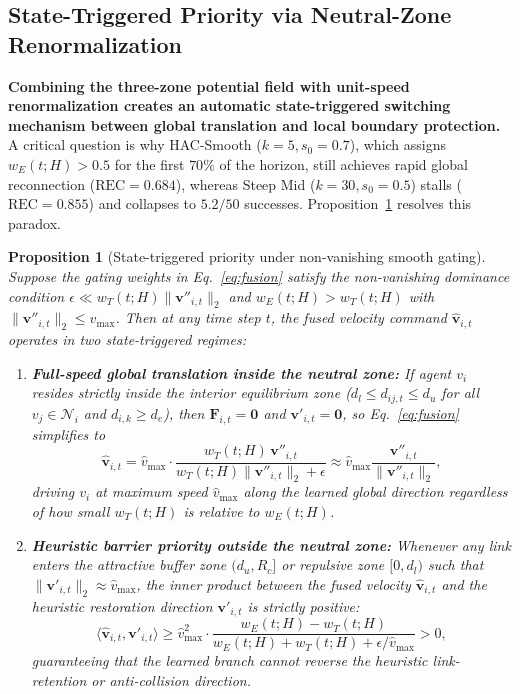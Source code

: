 \documentclass[11pt]{article}
\theoremstyle{plain}
\newtheorem{proposition}{Proposition}
\theoremstyle{definition}
\theoremstyle{remark}
\begin{document}
\subsection{State-Triggered Priority via Neutral-Zone Renormalization}
\label{sec:neutral-zone}

\textbf{Combining the three-zone potential field with unit-speed renormalization creates an automatic state-triggered switching mechanism between global translation and local boundary protection.} A critical question is why HAC-Smooth ($k=5, s_0=0.7$), which assigns $w_E(t; H) > 0.5$ for the first $70\%$ of the horizon, still achieves rapid global reconnection ($\mathrm{REC} = 0.684$), whereas Steep Mid ($k=30, s_0=0.5$) stalls ($\mathrm{REC} = 0.855$) and collapses to $5.2/50$ successes. Proposition~\ref{prop:neutral-renorm} resolves this paradox.

\begin{proposition}[State-triggered priority under non-vanishing smooth gating]
\label{prop:neutral-renorm}
Suppose the gating weights in Eq.~\eqref{eq:fusion} satisfy the non-vanishing dominance condition $\epsilon \ll w_T(t; H)\|\mathbf{v}''_{i,t}\|_2$ and $w_E(t; H) > w_T(t; H)$ with $\|\mathbf{v}''_{i,t}\|_2 \le \hat{v}_{\max}$. Then at any time step $t$, the fused velocity command $\hat{\mathbf{v}}_{i,t}$ operates in two state-triggered regimes:
\begin{enumerate}[nosep]
  \item \textbf{Full-speed global translation inside the neutral zone:} If agent $v_i$ resides strictly inside the interior equilibrium zone ($d_l \le d_{ij,t} \le d_u$ for all $v_j \in \mathcal{N}_i$ and $d_{i,k} \ge d_e$), then $\mathbf{F}_{i,t} = \mathbf{0}$ and $\mathbf{v}'_{i,t} = \mathbf{0}$, so Eq.~\eqref{eq:fusion} simplifies to
  \begin{equation}
    \hat{\mathbf{v}}_{i,t} = \hat{v}_{\max} \cdot \frac{w_T(t; H)\,\mathbf{v}''_{i,t}}{w_T(t; H)\|\mathbf{v}''_{i,t}\|_2 + \epsilon} \approx \hat{v}_{\max} \frac{\mathbf{v}''_{i,t}}{\|\mathbf{v}''_{i,t}\|_2},
    \label{eq:neutral-amplification}
  \end{equation}
  driving $v_i$ at maximum speed $\hat{v}_{\max}$ along the learned global direction regardless of how small $w_T(t; H)$ is relative to $w_E(t; H)$.
  \item \textbf{Heuristic barrier priority outside the neutral zone:} Whenever any link enters the attractive buffer zone $(d_u, R_c]$ or repulsive zone $[0, d_l)$ such that $\|\mathbf{v}'_{i,t}\|_2 \approx \hat{v}_{\max}$, the inner product between the fused velocity $\hat{\mathbf{v}}_{i,t}$ and the heuristic restoration direction $\mathbf{v}'_{i,t}$ is strictly positive:
  \begin{equation}
    \langle \hat{\mathbf{v}}_{i,t}, \mathbf{v}'_{i,t} \rangle \ge \hat{v}_{\max}^2 \cdot \frac{w_E(t; H) - w_T(t; H)}{w_E(t; H) + w_T(t; H) + \epsilon/\hat{v}_{\max}} > 0,
  \end{equation}
  guaranteeing that the learned branch cannot reverse the heuristic link-retention or anti-collision direction.
\end{enumerate}
\end{proposition}
\end{document}
